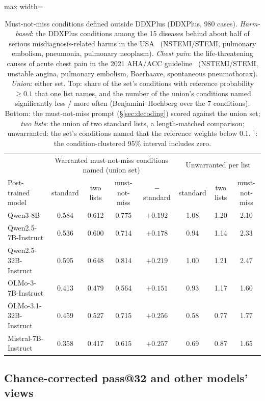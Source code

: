 \documentclass[11pt]{article}
\begin{document}
\begin{table}[t]
\medskip
\begin{adjustbox}{max width=\linewidth}
\begin{tabular}{lccccccc}
\toprule
 & \multicolumn{4}{c}{Warranted must-not-miss conditions named (union set)} & \multicolumn{3}{c}{Unwarranted per list} \\
Post-trained model & standard & two lists & must-not-miss & $-$ standard & standard & two lists & must-not-miss \\
\midrule
Qwen3-8B & 0.584 & 0.612 & 0.775 & $+0.192$ & 1.08 & 1.20 & 2.10 \\
Qwen2.5-7B-Instruct & 0.536 & 0.600 & 0.714 & $+0.178$ & 0.94 & 1.14 & 2.33 \\
Qwen2.5-32B-Instruct & 0.595 & 0.648 & 0.814 & $+0.219$ & 1.00 & 1.21 & 2.47 \\
OLMo-3-7B-Instruct & 0.413 & 0.479 & 0.564 & $+0.151$ & 0.93 & 1.17 & 1.60 \\
OLMo-3.1-32B-Instruct & 0.459 & 0.527 & 0.715 & $+0.256$ & 0.58 & 0.77 & 1.77 \\
Mistral-7B-Instruct & 0.358 & 0.417 & 0.615 & $+0.257$ & 0.69 & 0.87 & 1.65 \\
\bottomrule
\end{tabular}
\end{adjustbox}
\caption{Must-not-miss conditions defined outside DDXPlus (DDXPlus, 980 cases). \emph{Harm-based}: the DDXPlus conditions among the 15 diseases behind about half of serious misdiagnosis-related harms in the USA~\citep{newmantoker2024burden} (NSTEMI/STEMI, pulmonary embolism, pneumonia, pulmonary neoplasm). \emph{Chest pain}: the life-threatening causes of acute chest pain in the 2021 AHA/ACC guideline~\citep{gulati2021chestpain} (NSTEMI/STEMI, unstable angina, pulmonary embolism, Boerhaave, spontaneous pneumothorax). \emph{Union}: either set. Top: share of the set's conditions with reference probability $\geq 0.1$ that one list names, and the number of the union's conditions named significantly less / more often (Benjamini--Hochberg over the 7 conditions). Bottom: the must-not-miss prompt (\S\ref{sec:decoding}) scored against the union set; \emph{two lists}: the union of two standard lists, a length-matched comparison; unwarranted: the set's conditions named that the reference weights below 0.1. $^{\dagger}$: the condition-clustered 95\% interval includes zero.}
\label{tab:extmnm}
\end{table}

\subsection{Chance-corrected pass@32 and other models' views}\label{sec:chance}
\end{document}
